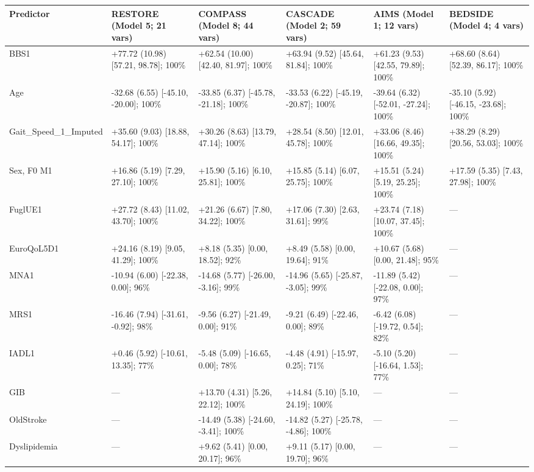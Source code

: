 \begin{tabular}{llllll}
\hline
Predictor & RESTORE (Model 5; 21 vars) & COMPASS (Model 8; 44 vars) & CASCADE (Model 2; 59 vars) & AIMS (Model 1; 12 vars) & BEDSIDE (Model 4; 4 vars) \\
\hline
BBS1 & +77.72 (10.98) [57.21, 98.78]; 100\% & +62.54 (10.00) [42.40, 81.97]; 100\% & +63.94 (9.52) [45.64, 81.84]; 100\% & +61.23 (9.53) [42.55, 79.89]; 100\% & +68.60 (8.64) [52.39, 86.17]; 100\% \\
Age & -32.68 (6.55) [-45.10, -20.00]; 100\% & -33.85 (6.37) [-45.78, -21.18]; 100\% & -33.53 (6.22) [-45.19, -20.87]; 100\% & -39.64 (6.32) [-52.01, -27.24]; 100\% & -35.10 (5.92) [-46.15, -23.68]; 100\% \\
Gait\_Speed\_1\_Imputed & +35.60 (9.03) [18.88, 54.17]; 100\% & +30.26 (8.63) [13.79, 47.14]; 100\% & +28.54 (8.50) [12.01, 45.78]; 100\% & +33.06 (8.46) [16.66, 49.35]; 100\% & +38.29 (8.29) [20.56, 53.03]; 100\% \\
Sex, F0 M1 & +16.86 (5.19) [7.29, 27.10]; 100\% & +15.90 (5.16) [6.10, 25.81]; 100\% & +15.85 (5.14) [6.07, 25.75]; 100\% & +15.51 (5.24) [5.19, 25.25]; 100\% & +17.59 (5.35) [7.43, 27.98]; 100\% \\
FuglUE1 & +27.72 (8.43) [11.02, 43.70]; 100\% & +21.26 (6.67) [7.80, 34.22]; 100\% & +17.06 (7.30) [2.63, 31.61]; 99\% & +23.74 (7.18) [10.07, 37.45]; 100\% & — \\
EuroQoL5D1 & +24.16 (8.19) [9.05, 41.29]; 100\% & +8.18 (5.35) [0.00, 18.52]; 92\% & +8.49 (5.58) [0.00, 19.64]; 91\% & +10.67 (5.68) [0.00, 21.48]; 95\% & — \\
MNA1 & -10.94 (6.00) [-22.38, 0.00]; 96\% & -14.68 (5.77) [-26.00, -3.16]; 99\% & -14.96 (5.65) [-25.87, -3.05]; 99\% & -11.89 (5.42) [-22.08, 0.00]; 97\% & — \\
MRS1 & -16.46 (7.94) [-31.61, -0.92]; 98\% & -9.56 (6.27) [-21.49, 0.00]; 91\% & -9.21 (6.49) [-22.46, 0.00]; 89\% & -6.42 (6.08) [-19.72, 0.54]; 82\% & — \\
IADL1 & +0.46 (5.92) [-10.61, 13.35]; 77\% & -5.48 (5.09) [-16.65, 0.00]; 78\% & -4.48 (4.91) [-15.97, 0.25]; 71\% & -5.10 (5.20) [-16.64, 1.53]; 77\% & — \\
GIB & — & +13.70 (4.31) [5.26, 22.12]; 100\% & +14.84 (5.10) [5.10, 24.19]; 100\% & — & — \\
OldStroke & — & -14.49 (5.38) [-24.60, -3.41]; 100\% & -14.82 (5.27) [-25.78, -4.86]; 100\% & — & — \\
Dyslipidemia & — & +9.62 (5.41) [0.00, 20.17]; 96\% & +9.11 (5.17) [0.00, 19.70]; 96\% & — & — \\

\end{tabular}
